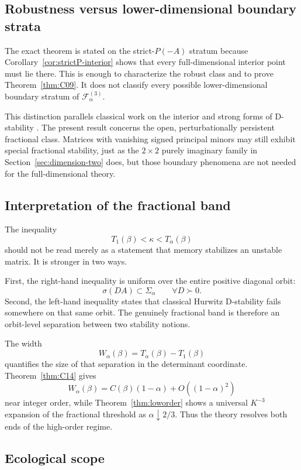 \subsection{Robustness versus lower-dimensional boundary strata}

The exact theorem is stated on the strict-\(P(-A)\) stratum because Corollary~\ref{cor:strictP-interior} shows that every full-dimensional interior point must lie there. This is enough to characterize the robust class and to prove Theorem~\ref{thm:C09}. It does not classify every possible lower-dimensional boundary stratum of \(\mathcal F_\alpha^{(3)}\).

This distinction parallels classical work on the interior and strong forms of D-stability \citep{Hartfiel1980,Abed1986}. The present result concerns the open, perturbationally persistent fractional class. Matrices with vanishing signed principal minors may still exhibit special fractional stability, just as the \(2\times2\) purely imaginary family in Section~\ref{sec:dimension-two} does, but those boundary phenomena are not needed for the full-dimensional theory.

\subsection{Interpretation of the fractional band}

The inequality
\[
T_1(\beta)<\kappa<T_\alpha(\beta)
\]
should not be read merely as a statement that memory stabilizes an unstable matrix. It is stronger in two ways.

First, the right-hand inequality is uniform over the entire positive diagonal orbit:
\[
\sigma(DA)\subset\Sigma_\alpha
\qquad
\forall D\succ0.
\]
Second, the left-hand inequality states that classical Hurwitz D-stability fails somewhere on that same orbit. The genuinely fractional band is therefore an orbit-level separation between two stability notions.

The width
\[
W_\alpha(\beta)
=
T_\alpha(\beta)-T_1(\beta)
\]
quantifies the size of that separation in the determinant coordinate. Theorem~\ref{thm:C14} gives
\[
W_\alpha(\beta)
=
C(\beta)(1-\alpha)
+
O((1-\alpha)^2)
\]
near integer order, while Theorem~\ref{thm:loworder} shows a universal \(K^{-3}\) expansion of the fractional threshold as \(\alpha\downarrow2/3\). Thus the theory resolves both ends of the high-order regime.

\subsection{Ecological scope}

